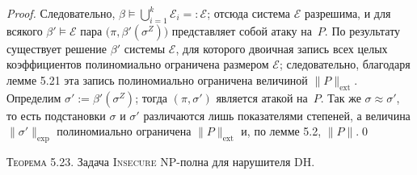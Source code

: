 \begin{proof}
Следовательно, \(\beta \models \bigcup_{i=1}^{k}\mathcal E_{i}=:\mathcal E\);
отсюда система \(\mathcal E\) разрешима, и для всякого
\(\beta'\models\mathcal E\) пара
\(\bigl(\pi,\beta'(\sigma^{Z})\bigr)\) представляет собой атаку на~\(P\).
По результату \cite{Bockmayr2001} существует решение
\(\beta'\) системы \(\mathcal E\), для которого двоичная запись всех
целых коэффициентов полиномиально ограничена размером \(\mathcal E\);
следовательно, благодаря лемме 5.21 эта запись
полиномиально ограничена величиной \(\lVert P\rVert_{\text{ext}}\).
Определим \(\sigma' := \beta'(\sigma^{Z})\);
тогда \((\pi,\sigma')\) является атакой на~\(P\). Так же \(\sigma \approx \sigma'\), то есть подстановки \(\sigma\) и
\(\sigma'\) различаются лишь показателями степеней,
а величина \(\lVert\sigma'\rVert_{\text{exp}}\) полиномиально ограничена
\(\lVert P\rVert_{\text{ext}}\) и, по лемме 5.2, \(\lVert P \rVert\).\qed
\end{proof}

\textsc{Теорема 5.23.}\; Задача \textsc{Insecure} NP-полна для нарушителя DH. 
